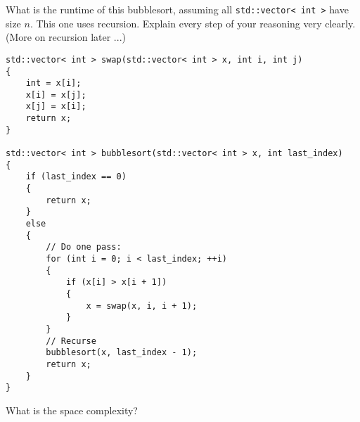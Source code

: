 What is the runtime of this bubblesort, assuming all
\verb!std::vector< int >! have size $n$.
This one uses recursion.
Explain every step of your reasoning very clearly.
(More on recursion later ...)
\begin{Verbatim}[frame=single,fontsize=\small]
std::vector< int > swap(std::vector< int > x, int i, int j)
{
    int = x[i];
    x[i] = x[j];
    x[j] = x[i];
    return x;
}
  
std::vector< int > bubblesort(std::vector< int > x, int last_index)
{
    if (last_index == 0)
    {
        return x;
    }
    else
    {
        // Do one pass:
        for (int i = 0; i < last_index; ++i)
        {
            if (x[i] > x[i + 1])
            {
                x = swap(x, i, i + 1);
            }
        }
        // Recurse
        bubblesort(x, last_index - 1);
        return x;
    }
}
\end{Verbatim}
What is the space complexity?
